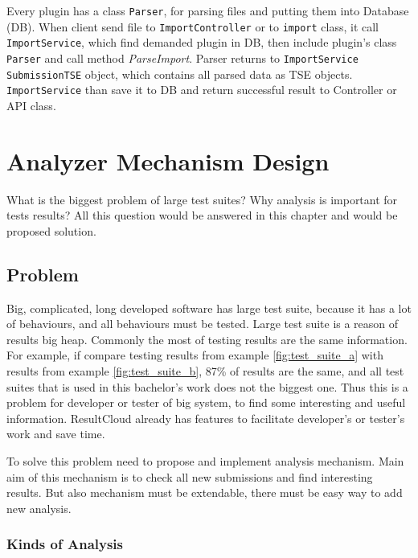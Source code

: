 Every plugin has a class \texttt{Parser}, for parsing files and putting them into Database (DB). When client send file to \texttt{ImportController} or to \texttt{import} class, it call \texttt{ImportService}, which find demanded plugin in DB, then include plugin's class \texttt{Parser} and call method \emph{ParseImport}. Parser returns to \texttt{ImportService} \texttt{SubmissionTSE} object, which contains all parsed data as TSE objects. \texttt{ImportService} than save it to DB and return successful result to Controller or API class.

\chapter{Analyzer Mechanism Design}
\label{ch:analyzer_proposal}

What is the biggest problem of large test suites? Why analysis is important for tests results? All this question would be answered in this chapter and would be proposed solution. 

\section{Problem}

Big, complicated, long developed software has large test suite, because it has a lot of behaviours, and all behaviours must be tested. Large test suite is a reason of results big heap. Commonly the most of testing results are the same information. For example, if compare testing results from example \ref{fig:test_suite_a} with results from example \ref{fig:test_suite_b}, 87\% of results are the same, and all test suites that is used in this bachelor's work does not the biggest one. Thus this is a problem for developer or tester of big system, to find some interesting and useful information. ResultCloud already has features to facilitate developer's or tester's work and save time.

To solve this problem need to propose and implement analysis mechanism. Main aim of this mechanism is to check all new submissions and find interesting results. But also mechanism must be extendable, there must be easy way to add new analysis.

\subsection{Kinds of Analysis}
\label{subsec:kinds}

